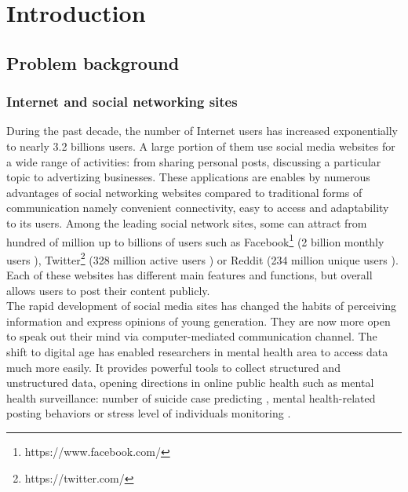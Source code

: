 
\chapter{Introduction}

\section{Problem background}
\subsection*{Internet and social networking sites}
During the past decade, the number of Internet users has increased exponentially to nearly 3.2 billions users. A large portion of them use social media websites for a wide range of activities: from sharing personal posts, discussing a particular topic to advertizing businesses. These applications are enables by numerous advantages of social networking websites compared to traditional forms of communication namely convenient connectivity, easy to access and adaptability to its users. Among the leading social network sites, some can attract from hundred of million up to billions of users such as Facebook\footnote{https://www.facebook.com/} (2 billion monthly users \cite{Welch2017}), Twitter\footnote{https://twitter.com/} (328 million active users \cite{Aslam2017}) or Reddit\cite{https://www.reddit.com/} (234 million unique users \cite{Alexa2017}). Each of these websites has different main features and functions, but overall allows users to post their content publicly.\\

The rapid development of social media sites has changed the habits of perceiving information and express opinions of young generation. They are now more open to speak out their mind via computer-mediated communication channel. The shift to digital age has enabled researchers in mental health area to access data much more easily. It provides powerful tools to collect structured and unstructured data, opening directions in online public health such as mental health surveillance: number of suicide case predicting \cite{Won2013}, mental health-related posting behaviors \cite{Berry2017} or stress level of individuals monitoring \cite{Liu2017}. \\

